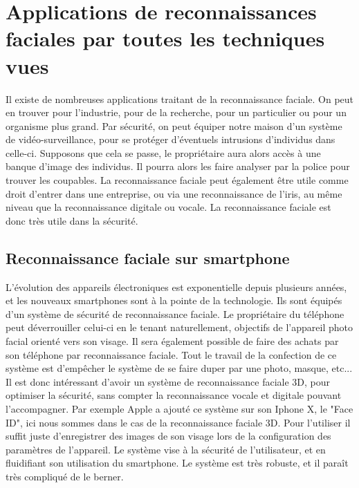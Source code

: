 \documentclass[12pt,french]{article}
\theoremstyle{plain}
\theoremstyle{definition}
\begin{document}
\section{Applications de reconnaissances faciales par toutes les techniques vues}
Il existe de nombreuses applications traitant de la reconnaissance faciale. On peut en trouver pour l'industrie, pour de la recherche, pour un particulier ou pour un organisme plus grand.
Par sécurité, on peut équiper notre maison d'un système de vidéo-surveillance, pour se protéger d'éventuels intrusions d'individus dans celle-ci. 
Supposons que cela se passe, le propriétaire aura alors accès à une banque d'image des individus. Il pourra alors les faire analyser par la police pour trouver les coupables. 
La reconnaissance faciale peut également être utile comme droit d'entrer dans une entreprise, ou via une reconnaissance de l'iris, au même niveau que la reconnaissance digitale ou vocale.
La reconnaissance faciale est donc très utile dans la sécurité.   
\subsection{Reconnaissance faciale sur smartphone}
L'évolution des appareils électroniques est exponentielle depuis plusieurs années, et les nouveaux smartphones sont à la pointe de la technologie. Ils sont équipés d'un système de sécurité de reconnaissance faciale. Le propriétaire du téléphone peut déverrouiller celui-ci en le tenant naturellement, objectifs de l'appareil photo facial orienté vers son visage. Il sera également possible de faire des achats par son téléphone par reconnaissance faciale. Tout le travail de la confection de ce système est d'empêcher le système de se faire duper par une photo, masque, etc... Il est donc intéressant d'avoir un système de reconnaissance faciale 3D, pour optimiser la sécurité, sans compter la reconnaissance vocale et digitale pouvant l'accompagner. 
Par exemple Apple a ajouté ce système sur son Iphone X, le "Face ID", ici nous sommes dans le cas de la reconnaissance faciale 3D. Pour l'utiliser il suffit juste d'enregistrer des images de son visage lors de la configuration des paramètres de l'appareil. Le système vise à la sécurité de l'utilisateur, et en fluidifiant son utilisation du smartphone. Le système est très robuste, et il paraît très compliqué de le berner.
\end{document}
